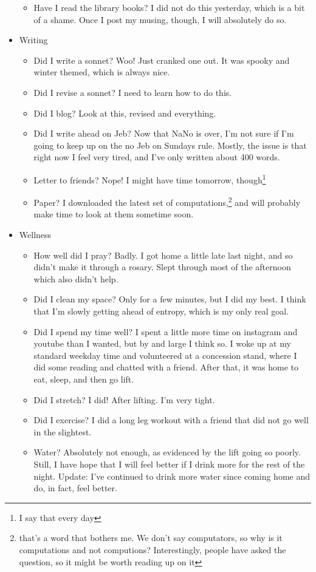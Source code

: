 \documentclass[12pt]{article}[titlepage]
\newcommand{\1}{\={a}}
\newcommand{\2}{\={e}}
\newcommand{\3}{\={\i}}
\newcommand{\4}{\=o}
\newcommand{\5}{\=u}
\newcommand{\6}{\={A}}
\renewcommand{\,}{\textsuperscript{,}}
\begin{document}
\begin{itemize}
\begin{itemize}
\item Have I read the library books? I did not do this yesterday, which is a bit of a shame. Once I post my musing, though, I will absolutely do so. 
\end{itemize}
\item Writing
\begin{itemize}
\item Did I write a sonnet? Woo! Just cranked one out. It was spooky and winter themed, which is always nice. 
\item Did I revise a sonnet? I need to learn how to do this. 
\item Did I blog? Look at this, revised and everything. 
\item Did I write ahead on Jeb? Now that NaNo is over, I'm not sure if I'm going to keep up on the no Jeb on Sundays rule.
Mostly, the issue is that right now I feel very tired, and I've only written about 400 words. 
\item Letter to friends? Nope! I might have time tomorrow, though\footnote{I say that every day} 
\item Paper? I downloaded the latest set of computations,\footnote{that's a word that bothers me. We don't say computators, so why is it computations and not computions? Interestingly, people have asked the question, so it might be worth reading up on it} and will probably make time to look at them sometime soon. 
\end{itemize}
\item Wellness
\begin{itemize}
\item How well did I pray? Badly. I got home a little late last night, and so didn't make it through a rosary. Slept through most of the afternoon which also didn't help. 
\item Did I clean my space? Only for a few minutes, but I did my best. I think that I'm slowly getting ahead of entropy, which is my only real goal. 
\item Did I spend my time well? I spent a little more time on instagram and youtube than I wanted, but by and large I think so.
I woke up at my standard weekday time and volunteered at a concession stand, where I did some reading and chatted with a friend.
After that, it was home to eat, sleep, and then go lift. 
\item Did I stretch? I did! After lifting. I'm very tight. 
\item Did I exercise? I did a long leg workout with a friend that did not go well in the slightest. 
\item Water? Absolutely not enough, as evidenced by the lift going so poorly. Still, I have hope that I will feel better if I drink more for the rest of the night.
Update: I've continued to drink more water since coming home and do, in fact, feel better. 
\end{itemize} 
\end{itemize}
\end{document}

